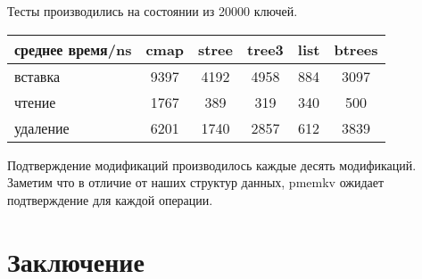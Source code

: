 \documentclass[pdftex,ptm,12pt,a4paper]{report}
\theoremstyle{definition}
\begin{document}
Тесты производились на состоянии из 20000 ключей.

\begin{center}
\begin{tabular} {|l| c c c c c|}
\hline
среднее время/ns & cmap & stree & tree3 & list & btrees \\
\hline
вставка & 9397 & 4192 & 4958 & 884 & 3097 \\
чтение & 1767 & 389 & 319 & 340 & 500 \\
удаление & 6201 & 1740 & 2857 & 612 & 3839 \\
\hline
\end{tabular}
\end{center}

Подтверждение модификаций производилось каждые десять модификаций. Заметим что в отличие от наших структур данных, pmemkv ожидает подтверждение для каждой операции.

\chapter{Заключение}



\end{document}
